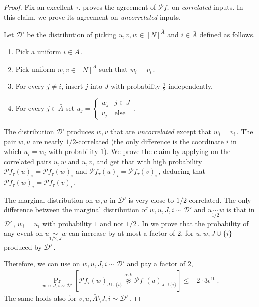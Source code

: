 \documentclass[11pt]{article}
\numberwithin{equation}{section}
\theoremstyle{definition}
\theoremstyle{plain}
\newcommand{\Prob}[2][]{\Pr_{{#1}}\left[#2\right]} %
\newcommand{\set}[1]{\{#1\}} %
\newcommand\f{f} %
\newcommand\bh{\mathcal{P}\f_\tau} %
\newcommand\neqg[1]{\stackrel{{#1}}{ \not\approx}} %
\newcommand\cor[1]{\underset{\scriptscriptstyle#1}{\sim}} %
\newcommand\rest[1]{{\bar{#1}}}  %
\begin{document}
\begin{proof}	
	Fix an excellent $\tau$.  proves the agreement of $\bh$ on \emph{correlated} inputs. In this claim, we prove its agreement on \emph{uncorrelated} inputs.

Let $\mathcal{D}'$ be the distribution of picking $u,v,w\in[N]^{\bar{A}}$ and $i\in\bar{A}$ defined %
as follows.  %
	\begin{enumerate}
		\item Pick a uniform $i\in\bar{A}$\,.
		\item Pick uniform $w,v\in[N]^{\bar{A}}$ such that $w_i=v_i$\,.
		\item For every $j\neq i$, insert $j$ into $J$ with probability $\frac{1}{2}$ independently.
		\item For every $j\in\bar{A}$ set $u_j = \begin{cases}
		w_j &  j\in J\\
		v_j & \text {else}
		\end{cases} $\,.
	\end{enumerate}
	The distribution $\mathcal{D}'$ produces $w,v$ that are \emph{uncorrelated} except that $w_i=v_i$\,. The pair $w,u$ are nearly 
%
%
$1/2$-correlated  %
(the only difference is the coordinate $i$ in which $u_i=w_i$ with probability $1$). 
	We prove the claim by applying  on the correlated pairs $u,w$ and $u,v$, and get that with high probability $\bh(u)_i = \bh(w)_i$ and $\bh(u)_i = \bh(v)_i$\,, deducing that $\bh(w)_i=\bh(v)_i$\,.
	
	The marginal distribution on $w,u$ in $\mathcal{D}'$ is very close to 
%
%
$1/2$-correlated.  %
The only difference between the marginal distribution of $w,u,J,i\sim\mathcal{D}'$ and $u\cor{1/2}w$ is that in $\mathcal{D}'$\,, $w_i=u_i$ with probability $1$ and not 
	$1/2$\,. %
    In  we prove that the probability of any event on $u\cor{1/2,J}w$ can increase by at most a factor of $2$, for $u,w,J\cup\set{i}$ produced by $\mathcal{D}'$\,. 
    
	Therefore, we can use  on $w,u,J,i\sim\mathcal{D}'$ and pay a factor of $2$,
	\begin{align}\label{eq:large diff}
	\Prob[w,u,J,i\sim\mathcal{D}']{\bh(w)_{J\cup\set{i}} \neqg{\alpha_3 k} \bh(u)_{J\cup\set{i}}} \leq& 2\cdot3\epsilon^{10}\,.%
	\end{align}
	The same holds also for $v,u,\rest{A}\setminus J,i\sim\mathcal{D}'$\,.
	

\end{proof}
\end{document}
